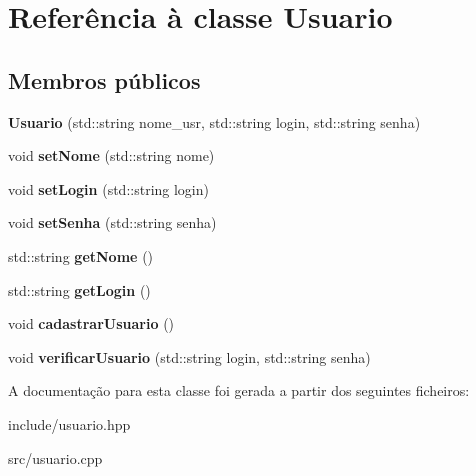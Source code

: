 \hypertarget{classUsuario}{}\section{Referência à classe Usuario}
\label{classUsuario}
\subsection*{Membros públicos}
\begin{DoxyCompactItemize}
\item 
\mbox{\label{classUsuario_a389f274625e8341e14c6e9e28765c74c}} 
{\bfseries Usuario} (std\+::string nome\+\_\+usr, std\+::string login, std\+::string senha)
\item 
\mbox{\label{classUsuario_ab6a6a430d055449a8e9d6c06253a272e}} 
void {\bfseries set\+Nome} (std\+::string nome)
\item 
\mbox{\label{classUsuario_af467cee861412f12882b67baf4b7481b}} 
void {\bfseries set\+Login} (std\+::string login)
\item 
\mbox{\label{classUsuario_a28efaec1398906b6f43b12877bf59db7}} 
void {\bfseries set\+Senha} (std\+::string senha)
\item 
\mbox{\label{classUsuario_a9fd39b37a8f38cfd990aba2234de9ea0}} 
std\+::string {\bfseries get\+Nome} ()
\item 
\mbox{\label{classUsuario_a7365b10dc6f45cde4b6ae89d2aac8194}} 
std\+::string {\bfseries get\+Login} ()
\item 
\mbox{\label{classUsuario_a69092834a0de5555d3260e38c198eda7}} 
void {\bfseries cadastrar\+Usuario} ()
\item 
\mbox{\label{classUsuario_ae796d022667174645477a702507cce17}} 
void {\bfseries verificar\+Usuario} (std\+::string login, std\+::string senha)
\end{DoxyCompactItemize}


A documentação para esta classe foi gerada a partir dos seguintes ficheiros\+:\begin{DoxyCompactItemize}
\item 
include/usuario.\+hpp\item 
src/usuario.\+cpp\end{DoxyCompactItemize}
